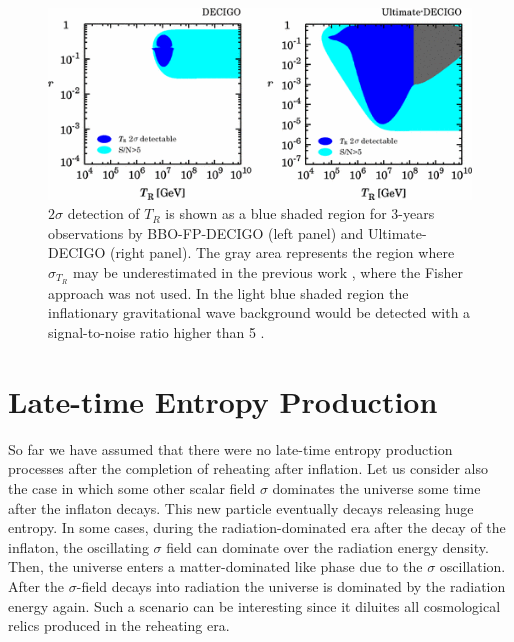\documentclass[11pt,a4paper,twoside]{book}
\begin{document}
\begin{figure}[]
	\centering
	\includegraphics[width=0.8\linewidth, height=0.25\textheight]{Images/Chap3/Kurojanagi_Nakayama_Fig6}
	\caption{$ 2\sigma $ detection of $ T_{R} $ is shown as a blue shaded region for 3-years observations by BBO-FP-DECIGO (left panel) and Ultimate-DECIGO (right panel). The gray area represents the region where $ \sigma_{T_{R}} $ may be underestimated in the previous work \cite{Chap3:ProibingReheatingTemperature2008}, where the Fisher approach was not used. In the light blue shaded region  the inflationary gravitational wave background would be detected with a signal-to-noise ratio higher than 5 \cite{Chap3:ProspectsForDeterminationWithDetectors}.}
	\label{fig:kurojanaginakayamafig6}
\end{figure}
\section{Late-time Entropy Production}
So far we have assumed that there were no late-time entropy production processes after the completion of reheating after inflation. Let us consider also the case in which some other scalar field $\sigma$  dominates the universe some time after the inflaton decays. This new particle eventually decays releasing huge entropy. In some cases, during the radiation-dominated era after the decay of the inflaton, the oscillating $\sigma$ field can dominate over the radiation energy density. Then, the universe enters a matter-dominated like phase due to the $\sigma$ oscillation. After the $\sigma$-field decays into radiation the universe is dominated by the radiation energy again. Such a scenario can be interesting since it diluites all cosmological relics produced in the reheating era. 
\end{document}
